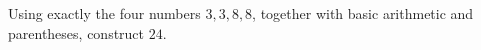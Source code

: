 Using exactly the four numbers $3,3,8,8$, together with basic arithmetic and parentheses, construct $24$.
